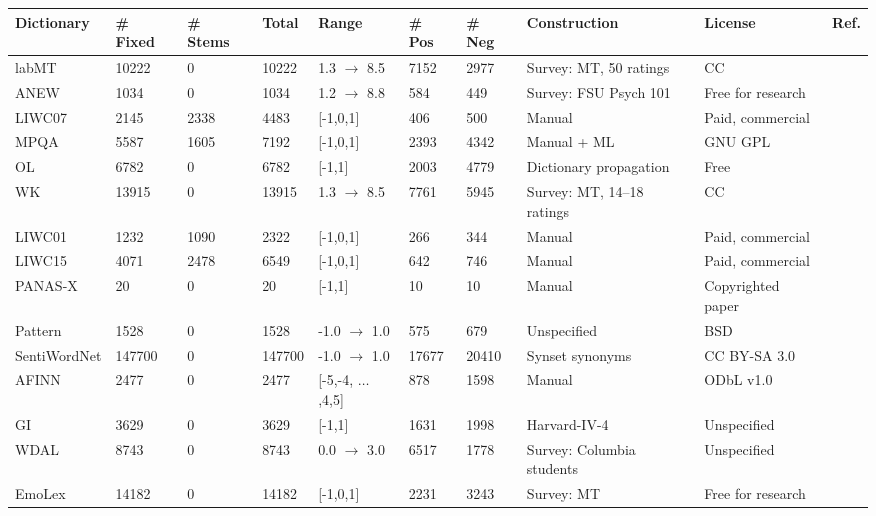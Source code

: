   {\scriptsize
  \begin{tabular*}{\linewidth}{ l | l | l | l | l | l | l | l | l | l}
    \hline
    Dictionary & \# Fixed & \# Stems & Total & Range & \# Pos & \# Neg & Construction & License & Ref.\\
    \hline
    \hline
    labMT & 10222 & 0 & 10222 & 1.3 $\to$ 8.5 & 7152 & 2977 & Survey: MT, 50 ratings & CC & \cite{dodds2015human}\\
    ANEW & 1034 & 0 & 1034 & 1.2 $\to$ 8.8 & 584 & 449 & Survey: FSU Psych 101 & Free for research & \cite{bradley1999affective}\\
    LIWC07 & 2145 & 2338 & 4483 & [-1,0,1] & 406 & 500 & Manual & Paid, commercial & \cite{pennebaker2001linguistic}\\
    MPQA & 5587 & 1605 & 7192 & [-1,0,1] & 2393 & 4342 & Manual + ML & GNU GPL & \cite{wilson2005recognizing}\\
    OL & 6782 & 0 & 6782 & [-1,1] & 2003 & 4779 & Dictionary propagation & Free & \cite{liu2010sentiment}\\
    WK & 13915 & 0 & 13915 & 1.3 $\to$ 8.5 & 7761 & 5945 & Survey: MT, 14--18 ratings & CC & \cite{warriner2013norms}\\
\hline
    LIWC01 & 1232 & 1090 & 2322 & [-1,0,1] & 266 & 344 & Manual & Paid, commercial & \cite{pennebaker2001linguistic}\\
    LIWC15 & 4071 & 2478 & 6549 & [-1,0,1] & 642 & 746 & Manual & Paid, commercial & \cite{pennebaker2001linguistic}\\
    PANAS-X & 20 & 0 & 20 & [-1,1] & 10 & 10 & Manual & Copyrighted paper & \cite{watson1999panas}\\
    Pattern & 1528 & 0 & 1528 & -1.0 $\to$ 1.0 & 575 & 679 & Unspecified & BSD & \cite{de2012pattern}\\
    SentiWordNet & 147700 & 0 & 147700 & -1.0 $\to$ 1.0 & 17677 & 20410 & Synset synonyms & CC BY-SA 3.0 & \cite{baccianella2010sentiwordnet}\\
    AFINN & 2477 & 0 & 2477 & [-5,-4, $\ldots$,4,5] & 878 & 1598 & Manual & ODbL v1.0 & \cite{nielsen2011new}\\
    GI & 3629 & 0 & 3629 & [-1,1] & 1631 & 1998 & Harvard-IV-4 & Unspecified & \cite{stone1966general}\\
    WDAL & 8743 & 0 & 8743 & 0.0 $\to$ 3.0 & 6517 & 1778 & Survey: Columbia students & Unspecified & \cite{whissell1986dictionary}\\
    EmoLex & 14182 & 0 & 14182 & [-1,0,1] & 2231 & 3243 & Survey: MT & Free for research & \cite{mohammad2013crowdsourcing}\\

\end{tabular*}}
